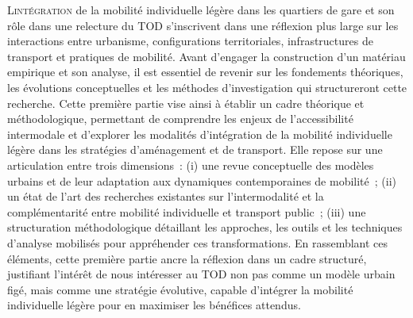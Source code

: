 \lettrine[lines=3, findent=8pt, nindent=0pt]{ L}{intégration} de la mobilité individuelle légère dans les quartiers de gare et son rôle dans une relecture du \acrfull{TOD} s’inscrivent dans une réflexion plus large sur les interactions entre urbanisme, configurations territoriales, infrastructures de transport et pratiques de mobilité. Avant d’engager la construction d'un matériau empirique et son analyse, il est essentiel de revenir sur les fondements théoriques, les évolutions conceptuelles et les méthodes d’investigation qui structureront cette recherche. Cette première partie vise ainsi à établir un cadre théorique et méthodologique, permettant de comprendre les enjeux de l’accessibilité intermodale et d’explorer les modalités d’intégration de la mobilité individuelle légère dans les stratégies d’aménagement et de transport. Elle repose sur une articulation entre trois dimensions~: (i) une revue conceptuelle des modèles urbains et de leur adaptation aux dynamiques contemporaines de mobilité~; (ii) un état de l’art des recherches existantes sur l’intermodalité et la complémentarité entre mobilité individuelle et transport public~; (iii) une structuration méthodologique détaillant les approches, les outils et les techniques d'analyse mobilisés pour appréhender ces transformations. En rassemblant ces éléments, cette première partie ancre la réflexion dans un cadre structuré, justifiant l'intérêt de nous intéresser au \acrshort{TOD} non pas comme un modèle urbain figé, mais comme une stratégie évolutive, capable d’intégrer la mobilité individuelle légère pour en maximiser les bénéfices attendus.%

